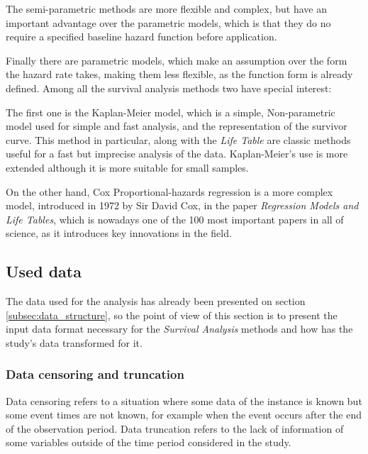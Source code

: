 \documentclass[11pt]{article} %
\begin{document}
    The semi-parametric methods are more flexible and complex, but have an important advantage over the parametric models, which is that they do no require a specified baseline hazard function before application.

    Finally there are parametric models, which make an assumption over the form the hazard rate takes, making them less flexible, as the function form is already defined. Among all the survival analysis methods two have special interest:

    The first one is the Kaplan-Meier model, which is a simple, Non-parametric model used for simple and fast analysis, and the representation of the survivor curve. This method in particular, along with the \emph{Life Table} are classic methods useful for a fast but imprecise analysis of the data. Kaplan-Meier's use is more extended although it is more suitable for small samples.

    On the other hand, Cox Proportional-hazards regression is a more complex model, introduced in 1972 by Sir David Cox, in the paper \emph{Regression Models and Life Tables}, which is nowadays one of the 100 most important papers in all of science, as it introduces key innovations in the field.

  \subsection{Used data}

    The data used for the analysis has already been presented on section \ref{subsec:data_structure}, so the point of view of this section is to present the input data format necessary for the \emph{Survival Analysis} methods and how has the study's data transformed for it.

    \subsubsection{Data censoring and truncation}
      \label{subsubsec:censoring}

      Data censoring refers to a situation where some data of the instance is known but some event times are not known, for example when the event occurs after the end of the observation period. Data truncation refers to the lack of information of some variables outside of the time period considered in the study.
\end{document}
